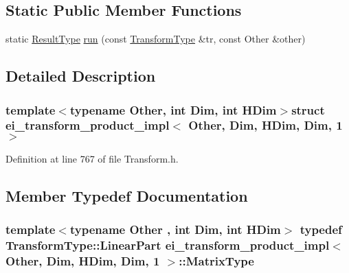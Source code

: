 \subsection*{Static Public Member Functions}
\begin{DoxyCompactItemize}
\item 
static \hyperlink{structei__transform__product__impl_3_01_other_00_01_dim_00_01_h_dim_00_01_dim_00_011_01_4_ae26335bd7244467f009fe4529fbea973}{Result\-Type} \hyperlink{structei__transform__product__impl_3_01_other_00_01_dim_00_01_h_dim_00_01_dim_00_011_01_4_aaf798f7da964d2f5946dc38a05f0f869}{run} (const \hyperlink{structei__transform__product__impl_3_01_other_00_01_dim_00_01_h_dim_00_01_dim_00_011_01_4_abf35704bad2bb1335d5421d9008e854e}{Transform\-Type} \&tr, const Other \&other)
\end{DoxyCompactItemize}


\subsection{Detailed Description}
\subsubsection*{template$<$typename Other, int Dim, int H\-Dim$>$struct ei\-\_\-transform\-\_\-product\-\_\-impl$<$ Other, Dim, H\-Dim, Dim, 1 $>$}



Definition at line 767 of file Transform.\-h.



\subsection{Member Typedef Documentation}
\hypertarget{structei__transform__product__impl_3_01_other_00_01_dim_00_01_h_dim_00_01_dim_00_011_01_4_a0e14c2e3d0fb9d91431fbb3c516daaef}{
\subsubsection[{Matrix\-Type}]{\setlength{\rightskip}{0pt plus 5cm}template$<$typename Other , int Dim, int H\-Dim$>$ typedef {\bf Transform\-Type\-::\-Linear\-Part} {\bf ei\-\_\-transform\-\_\-product\-\_\-impl}$<$ Other, Dim, H\-Dim, Dim, 1 $>$\-::{\bf Matrix\-Type}}}\label{structei__transform__product__impl_3_01_other_00_01_dim_00_01_h_dim_00_01_dim_00_011_01_4_a0e14c2e3d0fb9d91431fbb3c516daaef}


